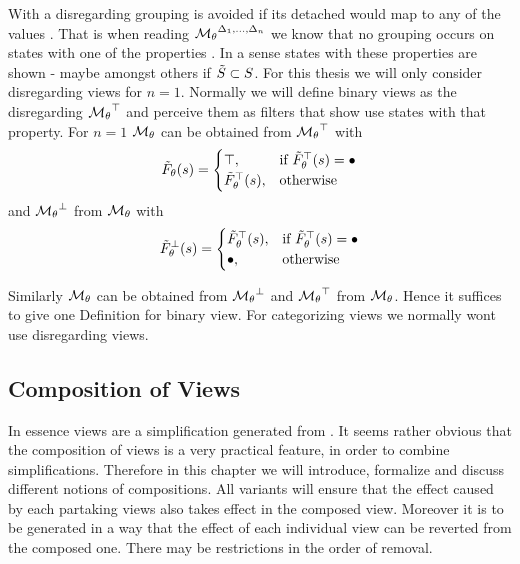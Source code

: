 \documentclass[preview]{standalone}
\begin{document}
With a disregarding \viewN grouping is avoided if its detached \grpfctN would map to any of the values \disregardelements. That is when reading ${{{{\mathcal{M}}}}_{{\theta}}}^{{{\Delta}_1, \dots, {\Delta}_n}}$ we know that no grouping occurs on states with one of the properties \disregardelements. In a sense states with these properties are shown - maybe amongst others if ${\tilde{{S}}} \subset {S}$. For this thesis we will only consider disregarding views for $n = 1$. Normally we will define binary views as the disregarding ${{{{\mathcal{M}}}}_{{\theta}}}^{\top}$ and perceive them as filters that show use states with that property. 
For $n = 1$ ${{{{\mathcal{M}}}}_{{\theta}}}$ can be obtained from ${{{{\mathcal{M}}}}_{{\theta}}}^{\top}$ with 
\[
{\tilde{F}_{{\theta}}}({s}) = 
\begin{cases}
	{\top},				& \text{if } {\tilde{F}_{\ensuremath{{\theta}}}}^{\top}({s}) = {\bullet}  \\
	{\tilde{F}_{{\theta}}}^{\top}({s}),       		& \text{otherwise }
\end{cases}
\]
and ${{{{\mathcal{M}}}}_{{\theta}}}^{\bot}$ from ${{{{\mathcal{M}}}}_{{\theta}}}$ with
\[
{\tilde{F}_{{\theta}}}^{\bot}({s}) = 
\begin{cases}
	{\tilde{F}_{\ensuremath{{\theta}}}}^{\top}({s}),       		&\text{if } {\tilde{F}_{\ensuremath{{\theta}}}}^{\top}({s}) = {\bullet}  \\ 
	{\bullet},				&\text{otherwise } 
\end{cases}
\]

Similarly ${{{{\mathcal{M}}}}_{{\theta}}}$ can be obtained from ${{{{\mathcal{M}}}}_{{\theta}}}^{\bot}$ and ${{{{\mathcal{M}}}}_{{\theta}}}^{\top}$ from ${{{{\mathcal{M}}}}_{{\theta}}}$. Hence it suffices to give one Definition for binary view. For categorizing views we normally wont use disregarding views.


\subsection{Composition of Views} \label{ch:composition}
In essence views are a simplification generated from \chgphN. It seems rather obvious that the composition of views is a very practical feature, in order to combine simplifications. Therefore in this chapter we will introduce, formalize and discuss different notions of compositions. All variants will ensure that the effect caused by each partaking views also takes effect in the composed view. Moreover it is to be generated in a way that the effect of each individual view can be reverted from the composed one. There may be restrictions in the order of removal.
\end{document}
